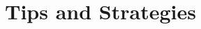 \documentclass[../uilmath.tex]{subfiles}
\begin{document}
\chapter{Tips and Strategies}
\end{document}
